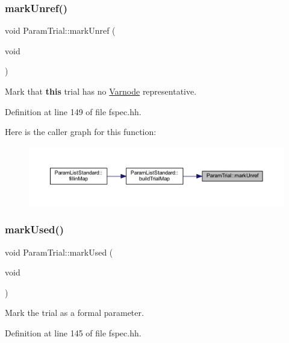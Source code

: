 \subsubsection{\texorpdfstring{markUnref()}{markUnref()}}
{\footnotesize\ttfamily void Param\+Trial\+::mark\+Unref (\begin{DoxyParamCaption}\item[{void}]{ }\end{DoxyParamCaption})\hspace{0.3cm}{\ttfamily [inline]}}



Mark that {\bfseries{this}} trial has no \mbox{\hyperlink{class_varnode}{Varnode}} representative. 



Definition at line 149 of file fspec.\+hh.

Here is the caller graph for this function\+:
\nopagebreak
\begin{figure}[H]
\begin{center}
\leavevmode
\includegraphics[width=350pt]{class_param_trial_a7ede623de85ba60fc1b3e463de10b0fc_icgraph}
\end{center}
\end{figure}
\mbox{\label{class_param_trial_aa4ffa0c04adb864a3cfcff61f5b75051}} 
\subsubsection{\texorpdfstring{markUsed()}{markUsed()}}
{\footnotesize\ttfamily void Param\+Trial\+::mark\+Used (\begin{DoxyParamCaption}\item[{void}]{ }\end{DoxyParamCaption})\hspace{0.3cm}{\ttfamily [inline]}}



Mark the trial as a formal parameter. 



Definition at line 145 of file fspec.\+hh.

